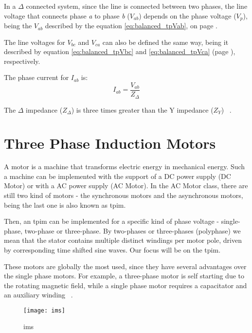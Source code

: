 In a $\Delta$ connected system, since the line is connected between two phases, the line voltage that connects phase \emph{a} to phase \emph{b} ($V_{ab}$) depends on the phase voltage ($V_{p}$), being the $V_{ab}$ described by the equation \ref{eq:balanced_tpVab}, on page \pageref{eq:balanced_tpVab}.

The line voltages for $V_{bc}$ and $V_{ca}$ can also be defined the same way, being it described by equation \ref{eq:balanced_tpVbc} and \ref{eq:balanced_tpVca} (page \pageref{eq:balanced_tpVab}), respectively. 

The phase current for $I_{ab}$ is:
\begin{equation} \label{eq:balanced_tpIab}
	I_{ab} = \frac{V_{ab}}{Z_{\Delta}}
\end{equation}

The $\Delta$ impedance ($Z_{\Delta}$) is three times greater than the Y impedance ($Z_{Y}$) ~\cite[chapter 11, p.~555]{Helfenstein2000}.




\section{Three Phase Induction Motors} %
\label{sec:three_phase_induction_motors}

A motor is a machine that transforms electric energy in mechanical energy.
Such a machine can be implemented with the support of a DC power supply (DC Motor) or with a AC power supply (AC Motor).
In the AC Motor class, there are still two kind of motors - the synchronous motors and the asynchronous motors, being the last one is also known as \acrfull{tpim}.


Then, an \acrshort{tpim} can be implemented for a specific kind of phase voltage - single-phase, two-phase or three-phase.
By two-phases or three-phases (polyphase) we mean that the stator contains multiple distinct windings per motor pole, driven by corresponding time shifted sine waves.
Our focus will be on the \acrfull{tpim}.

These motors are  globally the most used, since they have several advantages over the single phase motors. For example, a three-phase motor is self starting due to the rotating magnetic field, while a single phase motor requires a capacitator and an auxiliary winding ~\cite{Ferreira1}.

\begin{figure}[htbp]
	\centering
	\texttt{[image: ims]}
	\caption{\acrfull{ims}}
	\label{fig:ims}
\end{figure}

